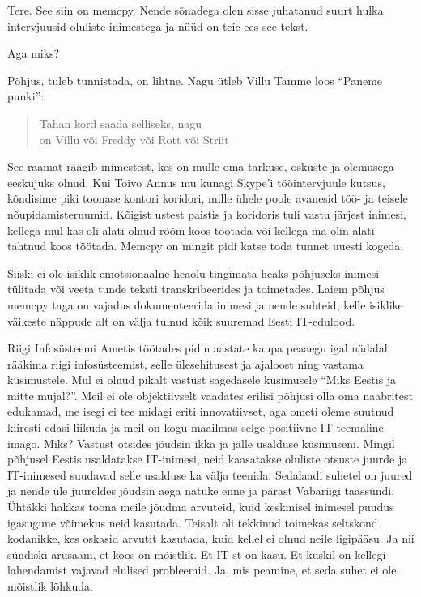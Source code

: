 Tere. See siin on memcpy. Nende sõnadega olen sisse juhatanud suurt hulka 
intervjuusid oluliste inimestega ja nüüd on teie ees see tekst. 

Aga miks? 

Põhjus, tuleb tunnistada, on lihtne. Nagu ütleb Villu Tamme loos 
\enquote{Paneme punki}:

\begin{verse}
Tahan kord saada selliseks, nagu \\
on Villu või Freddy või Rott või Striit\\
\end{verse}

See raamat räägib inimestest, kes on mulle oma tarkuse, oskuste ja olemusega 
eeskujuks olnud. Kui Toivo Annus mu kunagi Skype'i 
tööintervjuule kutsus, kõndisime piki toonase kontori koridori, mille ühele 
poole avanesid töö- ja teisele nõupidamisteruumid. Kõigist ustest paistis ja 
koridoris tuli vastu järjest inimesi, kellega mul kas oli alati olnud rõõm koos 
töötada või kellega ma olin alati tahtnud koos töötada. Memcpy on mingit pidi 
katse toda tunnet uuesti kogeda.

Siiski ei ole isiklik emotsionaalne heaolu tingimata heaks põhjuseks inimesi 
tülitada või veeta tunde teksti transkribeerides ja toimetades. Laiem põhjus 
memcpy taga on vajadus dokumenteerida inimesi ja nende suhteid, kelle isiklike 
väikeste näppude alt on välja tulnud kõik suuremad Eesti IT-edulood. 

Riigi Infosüsteemi Ametis töötades pidin aastate 
kaupa peaaegu igal nädalal rääkima riigi infosüsteemist, selle ülesehitusest ja 
ajaloost ning vastama küsimustele. Mul ei olnud pikalt vastust sagedasele 
küsimusele \enquote{Miks Eestis ja mitte mujal?}. Meil ei ole objektiivselt 
vaadates erilisi põhjusi olla oma naabritest edukamad, me isegi ei tee midagi 
eriti innovatiivset, aga ometi oleme suutnud kiiresti edasi liikuda ja meil on 
kogu maailmas selge positiivne IT-teemaline imago. Miks? Vastust otsides 
jõudsin ikka ja jälle usalduse küsimuseni. Mingil põhjusel Eestis usaldatakse 
IT-inimesi, neid kaasatakse oluliste otsuste juurde ja IT-inimesed suudavad 
selle usalduse ka välja teenida. Sedalaadi suhetel on juured ja nende üle 
juureldes jõudsin aega natuke enne ja pärast Vabariigi taassündi. Ühtäkki 
hakkas toona meile jõudma arvuteid, kuid keskmisel inimesel puudus igasugune võimekus 
neid kasutada. Teisalt oli tekkinud toimekas seltskond kodanikke, kes oskasid 
arvutit kasutada, kuid kellel ei olnud neile ligipääsu. Ja nii sündiski 
arusaam, et koos on mõistlik. Et IT-st on kasu. Et kuskil on kellegi 
lahendamist vajavad elulised probleemid. Ja, mis peamine, et seda suhet ei ole 
mõistlik lõhkuda. 

